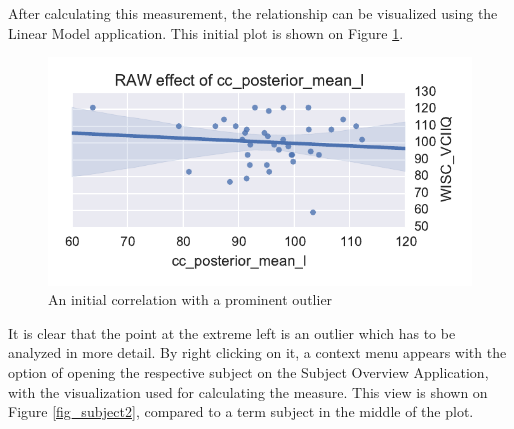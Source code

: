 \documentclass[twocolumn]{svjour3}
\begin{document}
After calculating this measurement, the relationship can be visualized using the Linear Model application. This initial plot is shown on Figure \ref{fig_lm}.

\begin{figure}
\begin{center}
\includegraphics[width=\linewidth]{figures/cases/initial_corr}
\end{center}
 \caption{\label{fig_lm}An initial correlation with a prominent outlier}
\end{figure}


It is clear that the point at the extreme left is an outlier which has to be analyzed in more detail. By right clicking on it, a context menu appears with the option of opening the respective subject on the Subject Overview Application, with the visualization used for calculating the measure. This view is shown on Figure \ref{fig_subject2}, compared to a term subject in the middle of the plot.
\end{document}
